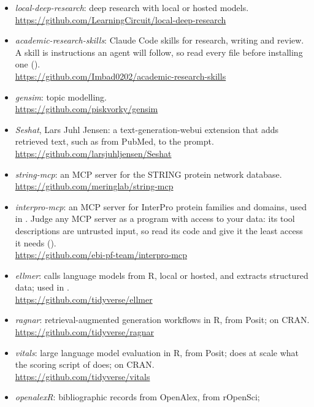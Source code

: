 \begin{itemize}
  \item \emph{local-deep-research}: deep research with local or hosted models.\\
    \url{https://github.com/LearningCircuit/local-deep-research}
  \item \emph{academic-research-skills}: Claude Code skills for research,
    writing and review. A skill is instructions an agent will follow, so read
    every file before installing one ().\\
    \url{https://github.com/Imbad0202/academic-research-skills}
  \item \emph{gensim}: topic modelling.\\
    \url{https://github.com/piskvorky/gensim}
  \item \emph{Seshat}, Lars Juhl Jensen: a text-generation-webui extension that
    adds retrieved text, such as from PubMed, to the prompt.\\
    \url{https://github.com/larsjuhljensen/Seshat}
  \item \emph{string-mcp}: an MCP server for the STRING protein network
    database.\\
    \url{https://github.com/meringlab/string-mcp}
  \item \emph{interpro-mcp}: an MCP server for InterPro protein families and
    domains, used in . Judge any MCP server as a program
    with access to your data: its tool descriptions are untrusted input, so
    read its code and give it the least access it needs ().\\
    \url{https://github.com/ebi-pf-team/interpro-mcp}
  \item \emph{ellmer}: calls language models from R, local or hosted, and
    extracts structured data; used in .\\
    \url{https://github.com/tidyverse/ellmer}
  \item \emph{ragnar}: retrieval-augmented generation workflows in R, from
    Posit; on CRAN.\\
    \url{https://github.com/tidyverse/ragnar}
  \item \emph{vitals}: large language model evaluation in R, from Posit; does
    at scale what the scoring script of  does; on CRAN.\\
    \url{https://github.com/tidyverse/vitals}
  \item \emph{openalexR}: bibliographic records from OpenAlex, from rOpenSci;

\end{itemize}
